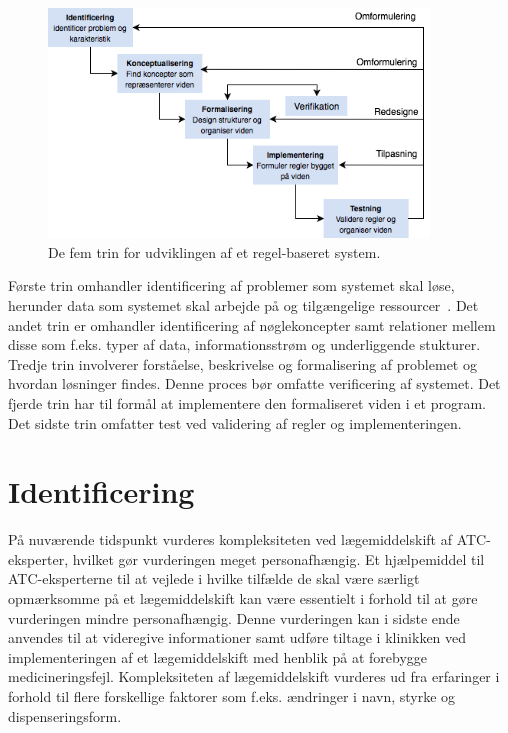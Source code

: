 \begin{figure}[H]\centering	\includegraphics[width=0.9\textwidth]{billeder/udviklingstrin.png} 
	\caption{De fem trin for udviklingen af et regel-baseret system.~\citep{Ligeza2006}}
	\label{fig:metode}  
\end{figure}
\vspace{-0.5cm}
Første trin omhandler identificering af problemer som systemet skal løse, herunder data som systemet skal arbejde på og tilgængelige ressourcer~\citep{Ligeza2006}. Det andet trin er omhandler identificering af nøglekoncepter samt relationer mellem disse som f.eks. typer af data, informationsstrøm og underliggende stukturer. Tredje trin involverer forståelse, beskrivelse og formalisering af problemet og hvordan løsninger findes. Denne proces bør omfatte verificering af systemet. Det fjerde trin har til formål at implementere den formaliseret viden i et program. Det sidste trin omfatter test ved validering af regler og implementeringen.~\citep{Ligeza2006}


\section{Identificering}
På nuværende tidspunkt vurderes kompleksiteten ved lægemiddelskift af ATC-eksperter, hvilket gør vurderingen meget personafhængig. Et hjælpemiddel til ATC-eksperterne til at vejlede i hvilke tilfælde de skal være særligt opmærksomme på et lægemiddelskift kan være essentielt i forhold til at gøre vurderingen mindre personafhængig. Denne vurderingen kan i sidste ende anvendes til at videregive informationer samt udføre tiltage i klinikken ved implementeringen af et lægemiddelskift med henblik på at forebygge medicineringsfejl. Kompleksiteten af lægemiddelskift vurderes ud fra erfaringer i forhold til flere forskellige faktorer som f.eks. ændringer i navn, styrke og dispenseringsform. 

